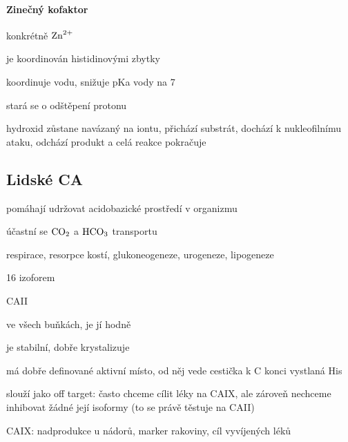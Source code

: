 \documentclass[DIV=8]{scrreprt}
\begin{document}

\paragraph{Zinečný kofaktor}
\begin{myItemize}[nosep]
    \item konkrétně \(\ce{Zn^{2+}}\)
    \item je koordinován histidinovými zbytky
    \item koordinuje vodu, snižuje pKa vody na 7
    \item stará se o odštěpení protonu
    \item hydroxid zůstane navázaný na iontu, přichází substrát, dochází k nukleofilnímu ataku, odchází produkt a celá reakce pokračuje
\end{myItemize}



\subsection{Lidské CA} \label{Lidské CA}


\begin{myItemize}[nosep]
    \item pomáhají udržovat acidobazické prostředí v organizmu
    \item účastní se \(\ce{CO2}\) a \(\ce{HCO3}\) transportu
\begin{myItemize}[nosep]
    \item respirace, resorpce kostí, glukoneogeneze, urogeneze, lipogeneze
\end{myItemize}

    \item 16 izoforem
\begin{myItemize}[nosep]
    \item CAII
\begin{myItemize}[nosep]
    \item ve všech buňkách, je jí hodně
    \item je stabilní, dobře krystalizuje
    \item má dobře definované aktivní místo, od něj vede cestička k C konci vystlaná His
    \item slouží jako off target: často chceme cílit léky na CAIX, ale zároveň nechceme inhibovat žádné její isoformy (to se právě těstuje na CAII)
\end{myItemize}

    \item CAIX: nadprodukce u nádorů, marker rakoviny, cíl vyvíjených léků
\end{myItemize}

\end{myItemize}
\end{document}
